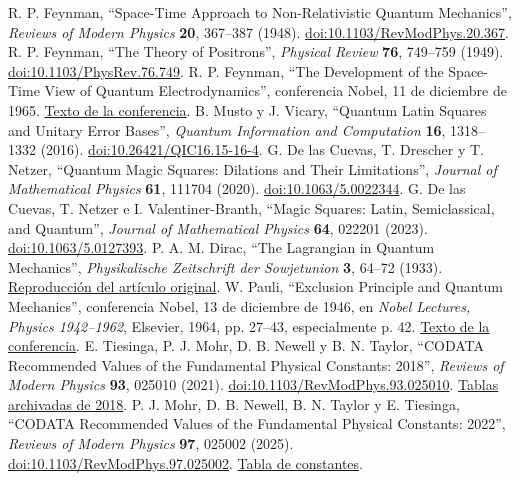 
{}
 R. P. Feynman, ``Space-Time Approach to Non-Relativistic Quantum Mechanics'', \emph{Reviews of Modern Physics} \textbf{20}, 367--387 (1948). \href{https://doi.org/10.1103/RevModPhys.20.367}{doi:10.1103/RevModPhys.20.367}.
 R. P. Feynman, ``The Theory of Positrons'', \emph{Physical Review} \textbf{76}, 749--759 (1949). \href{https://doi.org/10.1103/PhysRev.76.749}{doi:10.1103/PhysRev.76.749}.
 R. P. Feynman, ``The Development of the Space-Time View of Quantum Electrodynamics'', conferencia Nobel, 11 de diciembre de 1965. \href{https://www.nobelprize.org/prizes/physics/1965/feynman/lecture/}{Texto de la conferencia}.
 B. Musto y J. Vicary, ``Quantum Latin Squares and Unitary Error Bases'', \emph{Quantum Information and Computation} \textbf{16}, 1318--1332 (2016). \href{https://doi.org/10.26421/QIC16.15-16-4}{doi:10.26421/QIC16.15-16-4}.
 G. De las Cuevas, T. Drescher y T. Netzer, ``Quantum Magic Squares: Dilations and Their Limitations'', \emph{Journal of Mathematical Physics} \textbf{61}, 111704 (2020). \href{https://doi.org/10.1063/5.0022344}{doi:10.1063/5.0022344}.
 G. De las Cuevas, T. Netzer e I. Valentiner-Branth, ``Magic Squares: Latin, Semiclassical, and Quantum'', \emph{Journal of Mathematical Physics} \textbf{64}, 022201 (2023). \href{https://doi.org/10.1063/5.0127393}{doi:10.1063/5.0127393}.
 P. A. M. Dirac, ``The Lagrangian in Quantum Mechanics'', \emph{Physikalische Zeitschrift der Sowjetunion} \textbf{3}, 64--72 (1933). \href{https://www.informationphilosopher.com/solutions/scientists/dirac/Lagrangian_1933.pdf}{Reproducción del artículo original}.
 W. Pauli, ``Exclusion Principle and Quantum Mechanics'', conferencia Nobel, 13 de diciembre de 1946, en \emph{Nobel Lectures, Physics 1942--1962}, Elsevier, 1964, pp. 27--43, especialmente p. 42. \href{https://www.nobelprize.org/uploads/2018/06/pauli-lecture.pdf}{Texto de la conferencia}.
 E. Tiesinga, P. J. Mohr, D. B. Newell y B. N. Taylor, ``CODATA Recommended Values of the Fundamental Physical Constants: 2018'', \emph{Reviews of Modern Physics} \textbf{93}, 025010 (2021). \href{https://doi.org/10.1103/RevModPhys.93.025010}{doi:10.1103/RevModPhys.93.025010}. \href{https://physics.nist.gov/cuu/Constants/ArchiveASCII/allascii_2018.txt}{Tablas archivadas de 2018}.
 P. J. Mohr, D. B. Newell, B. N. Taylor y E. Tiesinga, ``CODATA Recommended Values of the Fundamental Physical Constants: 2022'', \emph{Reviews of Modern Physics} \textbf{97}, 025002 (2025). \href{https://doi.org/10.1103/RevModPhys.97.025002}{doi:10.1103/RevModPhys.97.025002}. \href{https://physics.nist.gov/cuu/Constants/Table/allascii.txt}{Tabla de constantes}.
